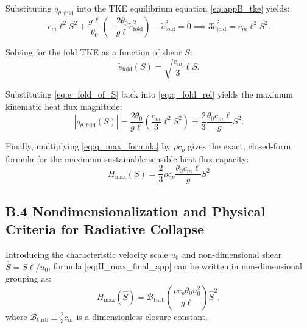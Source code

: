 Substituting $q_{\theta,\mathrm{fold}}$ into the TKE equilibrium equation \eqref{eq:appB_tke} yields:
\begin{equation}
c_m \ell^2 S^2 + \frac{g \ell}{\theta_0} \left( -\frac{2 \theta_0}{g \ell} \tilde e_{\mathrm{fold}}^2 \right) - \tilde e_{\mathrm{fold}}^2 = 0 \implies 3 \tilde e_{\mathrm{fold}}^2 = c_m \ell^2 S^2.
\end{equation}

Solving for the fold TKE as a function of shear $S$:
\begin{equation}
\tilde e_{\mathrm{fold}}(S) = \sqrt{\frac{c_m}{3}} \ell S.
\label{eq:e_fold_of_S}
\end{equation}

Substituting \eqref{eq:e_fold_of_S} back into \eqref{eq:q_fold_rel} yields the maximum kinematic heat flux magnitude:
\begin{equation}
|q_{\theta,\mathrm{fold}}(S)| = \frac{2 \theta_0}{g \ell} \left( \frac{c_m}{3} \ell^2 S^2 \right) = \frac{2}{3} \frac{\theta_0 c_m \ell}{g} S^2.
\label{eq:q_max_formula}
\end{equation}

Finally, multiplying \eqref{eq:q_max_formula} by $\rho c_p$ gives the exact, closed-form formula for the maximum sustainable sensible heat flux capacity:
\begin{equation}
\boxed{
H_{\max}(S) = \frac{2}{3} \rho c_p \frac{\theta_0 c_m \ell}{g} S^2
}
\label{eq:H_max_final_app}
\end{equation}

\subsection*{B.4 Nondimensionalization and Physical Criteria for Radiative Collapse}

Introducing the characteristic velocity scale $u_0$ and non-dimensional shear $\hat S = S \ell / u_0$, formula \eqref{eq:H_max_final_app} can be written in non-dimensional grouping as:
\begin{equation}
H_{\max}(\hat S) = \mathcal{B}_{\mathrm{turb}} \left( \frac{\rho c_p \theta_0 u_0^2}{g \ell} \right) \hat S^2,
\label{eq:H_max_nondim}
\end{equation}
where $\mathcal{B}_{\mathrm{turb}} \equiv \frac{2}{3} c_m$ is a dimensionless closure constant.

